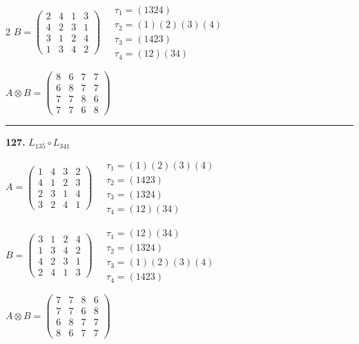 \begin{multicols}{2}
$B = \begin{pmatrix} 2 & 4 & 1 & 3 \\ 4 & 2 & 3 & 1 \\ 3 & 1 & 2 & 4 \\ 1 & 3 & 4 & 2 \end{pmatrix} \quad \begin{matrix} \tau_{1}=(1 3 2 4) \\ \tau_{2}=(1)(2)(3)(4) \\ \tau_{3}=(1 4 2 3) \\ \tau_{4}=(1 2)(3 4) \end{matrix}$

$A \otimes B = \begin{pmatrix} 8 & 6 & 7 & 7 \\ 6 & 8 & 7 & 7 \\ 7 & 7 & 8 & 6 \\ 7 & 7 & 6 & 8 \end{pmatrix}$

\vspace{0.3em}
\hrule
\vspace{0.3em}

\noindent\textbf{127.} $L_{135} \circ L_{341}$

$A = \begin{pmatrix} 1 & 4 & 3 & 2 \\ 4 & 1 & 2 & 3 \\ 2 & 3 & 1 & 4 \\ 3 & 2 & 4 & 1 \end{pmatrix} \quad \begin{matrix} \tau_{1}=(1)(2)(3)(4) \\ \tau_{2}=(1 4 2 3) \\ \tau_{3}=(1 3 2 4) \\ \tau_{4}=(1 2)(3 4) \end{matrix}$

$B = \begin{pmatrix} 3 & 1 & 2 & 4 \\ 1 & 3 & 4 & 2 \\ 4 & 2 & 3 & 1 \\ 2 & 4 & 1 & 3 \end{pmatrix} \quad \begin{matrix} \tau_{1}=(1 2)(3 4) \\ \tau_{2}=(1 3 2 4) \\ \tau_{3}=(1)(2)(3)(4) \\ \tau_{4}=(1 4 2 3) \end{matrix}$

$A \otimes B = \begin{pmatrix} 7 & 7 & 8 & 6 \\ 7 & 7 & 6 & 8 \\ 6 & 8 & 7 & 7 \\ 8 & 6 & 7 & 7 \end{pmatrix}$


\end{multicols}
